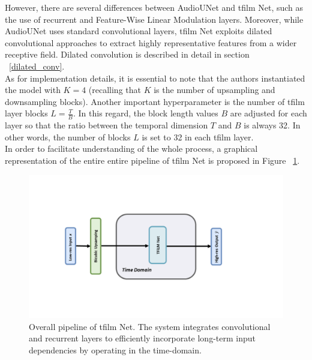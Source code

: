 However, there are several differences between AudioUNet and \gls{tfilm} Net, such as the use of recurrent and Feature-Wise Linear Modulation layers. Moreover, while AudioUNet uses standard convolutional layers, \gls{tfilm} Net exploits dilated convolutional approaches to extract highly representative features from a wider receptive field. Dilated convolution is described in detail in section ~\ref{dilated_conv}. \\
As for implementation details, it is essential to note that the authors instantiated the model with $K = 4$ (recalling that $K$ is the number of  upsampling and downsampling blocks). Another important hyperparameter is the number of \gls{tfilm} layer blocks $L = \frac{T}{B}$. In this regard, the block length values $B$ are adjusted for each layer so that the ratio between the temporal dimension $T$ and $B$ is always 32. In other words, the number of blocks $L$ is set to 32 in each \gls{tfilm} layer. \\
In order to facilitate understanding of the whole process, a graphical representation of the entire entire pipeline of \gls{tfilm} Net is proposed in Figure ~\ref{fig:tfilm_pipeline}. \\
\begin{figure}[!htb]
	\begin{center}
		\includegraphics[scale=0.48]{img/tfilm_pipeline.png}
		\captionsetup{margin=2cm}
		\caption{Overall pipeline of \gls{tfilm} Net. The system integrates convolutional and recurrent layers to efficiently incorporate long-term input dependencies by operating in the time-domain.} 
		\label{fig:tfilm_pipeline}
	\end{center}
\end{figure}


